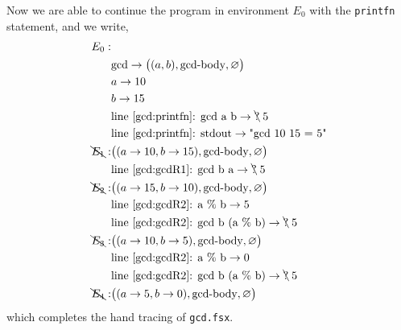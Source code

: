 \documentclass[fsharpnotes.tex]{subfiles}
\begin{document}
Now we are able to continue the program in environment $E_0$ with the \lstinline!printfn! statement, and we write,
\begin{align*}
  E_0:&\\
      & \text{gcd} \rightarrow \big((a, b), \text{gcd-body}, \varnothing\big)\\
      & a \rightarrow 10\\
      & b \rightarrow 15\\
      & \text{line~\ref{gcd:printfn}: gcd a b} \rightarrow \bcancel{\text{?}}\; 5\\
      & \text{line~\ref{gcd:printfn}: stdout} \rightarrow \text{"gcd 10 15 = 5"}\\
  \bcancel{E_1}:& \big((a \rightarrow 10, b \rightarrow 15), \text{gcd-body}, \varnothing\big)\\
      & \text{line~\ref{gcd:gcdR1}: gcd b a} \rightarrow \bcancel{\text{?}}\; 5\\
  \bcancel{E_2}:& \big((a \rightarrow 15, b \rightarrow 10), \text{gcd-body}, \varnothing\big)\\
      & \text{line~\ref{gcd:gcdR2}: a \% b} \rightarrow 5\\
      & \text{line~\ref{gcd:gcdR2}: gcd b (a \% b)} \rightarrow \bcancel{\text{?}}\; 5\\
  \bcancel{E_3}:& \big((a \rightarrow 10, b \rightarrow 5), \text{gcd-body}, \varnothing\big)\\
      & \text{line~\ref{gcd:gcdR2}: a \% b} \rightarrow 0\\
      & \text{line~\ref{gcd:gcdR2}: gcd b (a \% b)} \rightarrow \bcancel{\text{?}}\; 5\\
  \bcancel{E_4}:& \big((a \rightarrow 5, b \rightarrow 0), \text{gcd-body}, \varnothing\big)\\
\end{align*}
which completes the hand tracing of \lstinline[language=console]{gcd.fsx}.
\end{document}
